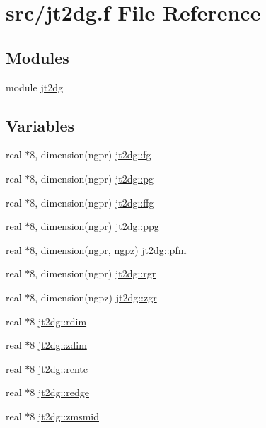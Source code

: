 \hypertarget{jt2dg_8f}{
\section{src/jt2dg.f File Reference}
\label{jt2dg_8f}
}
\subsection*{Modules}
\begin{CompactItemize}
\item 
module \hyperlink{namespacejt2dg}{jt2dg}
\end{CompactItemize}
\subsection*{Variables}
\begin{CompactItemize}
\item 
real $\ast$8, dimension(ngpr) \hyperlink{namespacejt2dg_17c615f62c0c05b808d87246266ab536}{jt2dg::fg}
\item 
real $\ast$8, dimension(ngpr) \hyperlink{namespacejt2dg_08d804a6c5152c65e1500244fa1410f6}{jt2dg::pg}
\item 
real $\ast$8, dimension(ngpr) \hyperlink{namespacejt2dg_80fab5edf3704e21b81149c9e637f497}{jt2dg::ffg}
\item 
real $\ast$8, dimension(ngpr) \hyperlink{namespacejt2dg_6f762b87bc8dd1ed612d879909319f97}{jt2dg::ppg}
\item 
real $\ast$8, dimension(ngpr, ngpz) \hyperlink{namespacejt2dg_b7a37a375ca78999b17c11ceea0bec58}{jt2dg::pfm}
\item 
real $\ast$8, dimension(ngpr) \hyperlink{namespacejt2dg_b4d8b9997f9926f576c02a07ccc16176}{jt2dg::rgr}
\item 
real $\ast$8, dimension(ngpz) \hyperlink{namespacejt2dg_60cde3de8e847fbf8f420fe9ce5f465d}{jt2dg::zgr}
\item 
real $\ast$8 \hyperlink{namespacejt2dg_b4ad724a904b761b05f1d0fe6ce382b8}{jt2dg::rdim}
\item 
real $\ast$8 \hyperlink{namespacejt2dg_4e55ac9b9c6c4c69545058d6b2194852}{jt2dg::zdim}
\item 
real $\ast$8 \hyperlink{namespacejt2dg_c556fd21d38d2c16cf2084c07b3c0c20}{jt2dg::rcntc}
\item 
real $\ast$8 \hyperlink{namespacejt2dg_b1344521a6c6c72af5caecd650ebe2f6}{jt2dg::redge}
\item 
real $\ast$8 \hyperlink{namespacejt2dg_201bfea2375282f6c8c0fd2b5c51a3fa}{jt2dg::zmsmid}

\end{CompactItemize}
